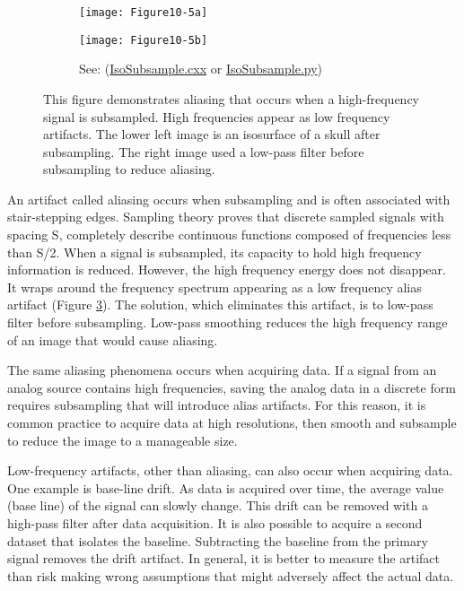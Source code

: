 \begin{figure}[htb]
	\begin{subfigure}[h]{0.96\linewidth}
		\texttt{[image: Figure10-5a]}
		\captionsetup{justification=centering}
		\caption*{}
		\label{fig:Figure10-5a}
	\end{subfigure}
	\hfill
	\begin{subfigure}[h]{0.96\linewidth}
		\texttt{[image: Figure10-5b]}
		\captionsetup{justification=centering}
		\caption*{See: (\href{https://lorensen.github.io/VTKExamples/site/Cxx/ImageProcessing/IsoSubsample/}{IsoSubsample.cxx} or \href{https://lorensen.github.io/VTKExamples/site/Python/ImageProcessing/IsoSubsample/}{IsoSubsample.py})}
		\label{fig:Figure10-5b}
	\end{subfigure}
	\caption{This figure demonstrates aliasing that occurs when a high-frequency signal is subsampled. High frequencies appear as low frequency artifacts. The lower left image is an isosurface of a skull after subsampling. The right image used a low-pass filter before subsampling to reduce aliasing.}\label{fig:Figure10-5}
\end{figure}

An artifact called aliasing occurs when subsampling and is often associated with stair-stepping edges. Sampling theory proves that discrete sampled signals with spacing S, completely describe continuous functions composed of frequencies less than S/2. When a signal is subsampled, its capacity to hold high frequency information is reduced. However, the high frequency energy does not disappear. It wraps around the frequency spectrum appearing as a low frequency alias artifact (Figure \ref{fig:Figure10-5}). The solution, which eliminates this artifact, is to low-pass filter before subsampling. Low-pass smoothing reduces the high frequency range of an image that would cause aliasing.

The same aliasing phenomena occurs when acquiring data. If a signal from an analog source contains high frequencies, saving the analog data in a discrete form requires subsampling that will introduce alias artifacts. For this reason, it is common practice to acquire data at high resolutions, then smooth and subsample to reduce the image to a manageable size.

Low-frequency artifacts, other than aliasing, can also occur when acquiring data. One example is base-line drift. As data is acquired over time, the average value (base line) of the signal can slowly change. This drift can be removed with a high-pass filter after data acquisition. It is also possible to acquire a second dataset that isolates the baseline. Subtracting the baseline from the primary signal removes the drift artifact. In general, it is better to measure the artifact than risk making wrong assumptions that might adversely affect the actual data.

